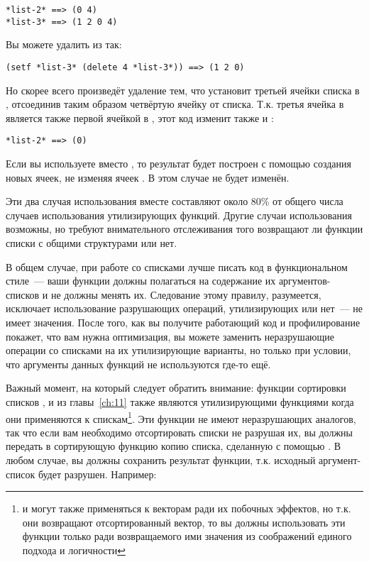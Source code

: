 \begin{lstlisting}
*list-2* ==> (0 4)
*list-3* ==> (1 2 0 4)
\end{lstlisting}

Вы можете удалить  из  так:

\begin{lstlisting}
(setf *list-3* (delete 4 *list-3*)) ==> (1 2 0)
\end{lstlisting}

Но  скорее всего произведёт удаление тем, что установит  третьей
ячейки списка в , отсоединив таким образом четвёртую ячейку от
списка. Т.к. третья ячейка в  является также первой ячейкой в ,
этот код изменит также и :

\begin{lstlisting}
*list-2* ==> (0)
\end{lstlisting}

Если вы используете  вместо , то результат будет построен с
помощью создания новых ячеек, не изменяя ячеек . В этом случае 
не будет изменён.

Эти два случая использования вместе составляют около 80\% от общего числа случаев
использования утилизирующих функций. Другие случаи использования возможны, но требуют
внимательного отслеживания того возвращают ли функции списки с общими структурами или нет.

В общем случае, при работе со списками лучше писать код в функциональном стиле~--- ваши
функции должны полагаться на содержание их аргументов-списков и не должны менять
их. Следование этому правилу, разумеется, исключает использование разрушающих операций,
утилизирующих или нет~--- не имеет значения. После того, как вы получите работающий код и
профилирование покажет, что вам нужна оптимизация, вы можете заменить неразрушающие
операции со списками на их утилизирующие варианты, но только при условии, что аргументы
данных функций не используются где-то ещё.

Важный момент, на который следует обратить внимание: функции сортировки списков
,  и  из главы~\ref{ch:11} также являются
утилизирующими функциями когда они применяются к спискам\footnote{ и
   могут также применяться к векторам ради их побочных эффектов, но
  т.к. они возвращают отсортированный вектор, то вы должны использовать эти функции только
  ради возвращаемого ими значения из соображений единого подхода и логичности}. Эти
функции не имеют неразрушающих аналогов, так что если вам необходимо отсортировать списки
не разрушая их, вы должны передать в сортирующую функцию копию списка, сделанную с помощью
. В любом случае, вы должны сохранить результат функции, т.к. исходный
аргумент-список будет разрушен. Например:

